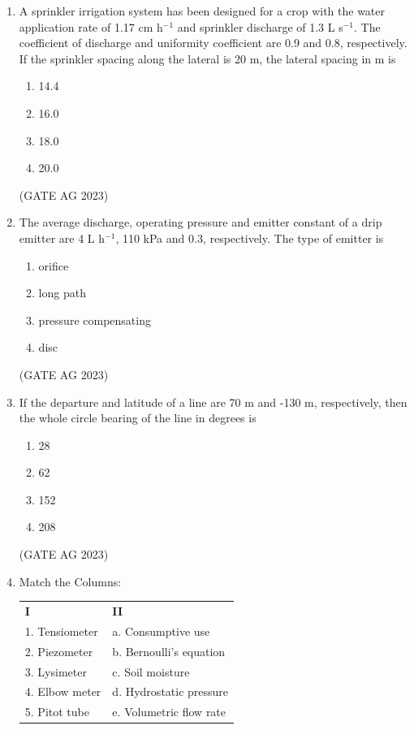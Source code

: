 \documentclass[journal,12pt,onecolumn]{IEEEtran}
\theoremstyle{remark}
\begin{document}
\begin{enumerate}
\item A sprinkler irrigation system has been designed for a crop with the water application rate of 1.17 cm h$^{-1}$ and sprinkler discharge of 1.3 L s$^{-1}$. The coefficient of discharge and uniformity coefficient are 0.9 and 0.8, respectively. If the sprinkler spacing along the lateral is 20 m, the lateral spacing in m is
\begin{enumerate}
    \item 14.4
    \item 16.0
    \item 18.0
    \item 20.0
\end{enumerate}
\hfill{(GATE AG 2023)}

\item The average discharge, operating pressure and emitter constant of a drip emitter are 4 L h$^{-1}$, 110 kPa and 0.3, respectively. The type of emitter is
\begin{enumerate}
    \item orifice
    \item long path
    \item pressure compensating
    \item disc
\end{enumerate}
\hfill{(GATE AG 2023)}

\item If the departure and latitude of a line are 70 m and -130 m, respectively, then the whole circle bearing of the line in degrees is
\begin{enumerate}
    \item 28
    \item 62
    \item 152
    \item 208
\end{enumerate}
\hfill{(GATE AG 2023)}

\item Match the Columns:

\begin{center}
\begin{tabular}{ll}
\textbf{I} & \textbf{II} \\
1. Tensiometer & a. Consumptive use \\
2. Piezometer & b. Bernoulli's equation \\
3. Lysimeter & c. Soil moisture \\
4. Elbow meter & d. Hydrostatic pressure \\
5. Pitot tube & e. Volumetric flow rate \\
\end{tabular}
\end{center}


\end{enumerate}
\end{document}
